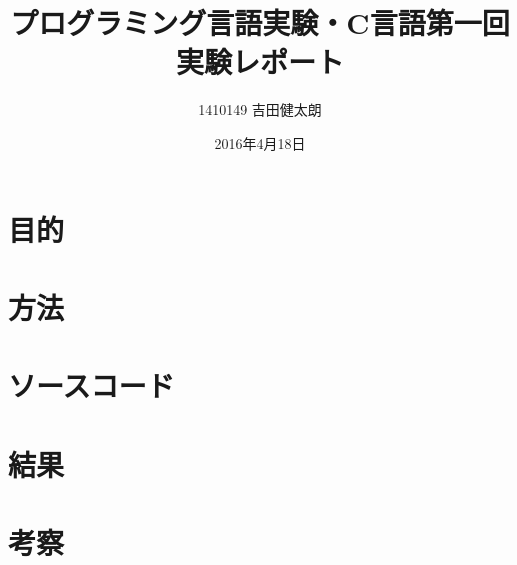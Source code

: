 \documentclass[a4j]{jarticle}
\date{2016年4月18日}
\author{1410149 吉田健太朗}
\title{プログラミング言語実験・C言語第一回実験レポート}
\begin{document}
\maketitle

\section{目的}


\section{方法}

\section{ソースコード}


\section{結果}


\section{考察}

\end{document}

